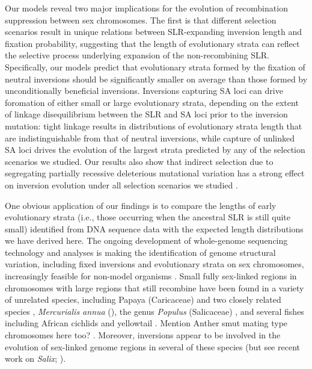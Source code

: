 \documentclass{article}[12pt]
\newcommand\hl[1]{%
  \bgroup
  \hskip0pt\color{blue!80!black}%
  #1%
  \egroup
}
\begin{document}
Our models reveal two major implications for the evolution of recombination suppression between sex chromosomes. The first is that different selection scenarios result in unique relations between SLR-expanding inversion length and fixation probability, suggesting that the length of evolutionary strata can reflect the selective process underlying expansion of the non-recombining SLR. Specifically, our models predict that evolutionary strata formed by the fixation of neutral inversions should be significantly smaller on average than those formed by unconditionally beneficial inversions. Inversions capturing SA loci can drive foromation of either small or large evolutionary strata, depending on the extent of linkage disequilibrium between the SLR and SA loci prior to the inversion mutation: tight linkage results in distributions of evolutionary strata length that are indistinguishable from that of neutral inversions, while capture of unlinked SA loci drives the evolution of the largest strata predicted by any of the selection scenarios we studied. Our results also show that indirect selection due to segregating partially recessive deleterious mutational variation has a strong effect on inversion evolution under all selection scenarios we studied \citep{Olito-etal-2022}.

One obvious application of our findings is to compare the lengths of early evolutionary strata (i.e., those occurring when the ancestral SLR is still quite small) identified from DNA sequence data with the expected length distributions we have derived here. The ongoing development of whole-genome sequencing technology and analyses is making the identification of genome structural variation, including fixed inversions and evolutionary strata on sex chromosomes, increasingly feasible for non-model organisms \citep[reviewed in ][]{Muyle2017, Charlesworth2018,PandayAzad2016}. Small fully sex-linked regions in chromosomes with large regions that still recombine have been found in a variety of unrelated species, including Papaya (Caricaceae) and two closely related species \citep{Wang2012, Lovene2015}, {\itshape Mercurialis annua} (\citealt{VeltsosPannell2019}), the genus {\itshape Populus}  (Salicaceae) \citep[reviewed in][]{HobzaEtAl2018}, and several fishes including African cichlids \citep{GammerdingerKocher2018} and yellowtail \citep{KoyamaEtAl2015}. \hl{Mention Anther smut mating type chromosomes here too?}. Moreover, inversions appear to be involved in the evolution of sex-linked genome regions in several of these species (but see recent work on {\itshape Salix}; \citealt{AlmeidaMank2019}). 
\end{document}
